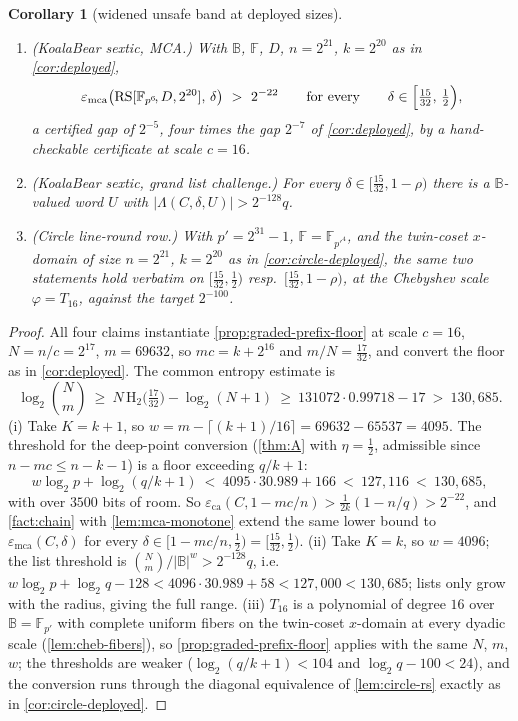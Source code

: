 \documentclass[11pt]{article}
\newtheorem{corollary}[corollary]{Corollary}
\theoremstyle{definition}
\theoremstyle{remark}
\newcommand{\F}{\mathbb{F}}
\newcommand{\B}{\mathbb{B}}
\newcommand{\RS}{\mathrm{RS}}
\newcommand{\eca}{\varepsilon_{\mathrm{ca}}}
\newcommand{\emca}{\varepsilon_{\mathrm{mca}}}
\newcommand{\Lst}{\Lambda}
\newcommand{\Hb}{\mathrm{H}_2}
\begin{document}
\begin{corollary}[widened unsafe band at deployed sizes]\label{cor:widened-deployed}
\begin{enumerate}[label=\textup{(\roman*)}]
\item \textup{(KoalaBear sextic, MCA.)} With $\B$, $\F$, $D$, $n=2^{21}$, $k=2^{20}$ as in \cref{cor:deployed},
\[
\emca\bigl(\RS[\F_{p^6}\!,D,2^{20}],\,\delta\bigr)\ >\ 2^{-22}
\qquad\text{for every}\qquad
\delta\in\Bigl[\tfrac{15}{32},\,\tfrac12\Bigr),
\]
a certified gap of $2^{-5}$, four times the gap $2^{-7}$ of \cref{cor:deployed}, by a hand-checkable certificate at scale $c=16$.
\item \textup{(KoalaBear sextic, grand list challenge.)} For every $\delta\in[\tfrac{15}{32},1-\rho)$ there is a $\B$-valued word $U$ with $|\Lst(C,\delta,U)|>2^{-128}q$.
\item \textup{(Circle line-round row.)} With $p'=2^{31}-1$, $\F=\F_{p'^4}$, and the twin-coset $x$-domain of size $n=2^{21}$, $k=2^{20}$ as in \cref{cor:circle-deployed}, the same two statements hold verbatim on $[\tfrac{15}{32},\tfrac12)$ resp.\ $[\tfrac{15}{32},1-\rho)$, at the Chebyshev scale $\varphi=T_{16}$, against the target $2^{-100}$.
\end{enumerate}
\end{corollary}

\begin{proof}
All four claims instantiate \cref{prop:graded-prefix-floor} at scale $c=16$, $N=n/c=2^{17}$, $m=69632$, so $mc=k+2^{16}$ and $m/N=\tfrac{17}{32}$, and convert the floor as in \cref{cor:deployed}. The common entropy estimate is
\[
\log_2\binom{N}{m}\ \ge\ N\,\Hb\bigl(\tfrac{17}{32}\bigr)-\log_2(N+1)\ \ge\ 131072\cdot0.99718-17\ >\ 130{,}685 .
\]
\textup{(i)} Take $K=k+1$, so $w=m-\lceil(k+1)/16\rceil=69632-65537=4095$. The threshold for the deep-point conversion (\cref{thm:A} with $\eta=\tfrac12$, admissible since $n-mc\le n-k-1$) is a floor exceeding $q/k+1$:
\[
w\log_2p+\log_2(q/k+1)\ <\ 4095\cdot30.989+166\ <\ 127{,}116\ <\ 130{,}685 ,
\]
with over $3500$ bits of room. So $\eca(C,1-mc/n)>\tfrac1{2k}(1-n/q)>2^{-22}$, and \cref{fact:chain} with \cref{lem:mca-monotone} extend the same lower bound to $\emca(C,\delta)$ for every $\delta\in[1-mc/n,\tfrac12)=[\tfrac{15}{32},\tfrac12)$.
\textup{(ii)} Take $K=k$, so $w=4096$; the list threshold is $\binom Nm/|\B|^w>2^{-128}q$, i.e.\ $w\log_2p+\log_2q-128<4096\cdot30.989+58<127{,}000<130{,}685$; lists only grow with the radius, giving the full range.
\textup{(iii)} $T_{16}$ is a polynomial of degree $16$ over $\B=\F_{p'}$ with complete uniform fibers on the twin-coset $x$-domain at every dyadic scale (\cref{lem:cheb-fibers}), so \cref{prop:graded-prefix-floor} applies with the same $N$, $m$, $w$; the thresholds are weaker ($\log_2(q/k+1)<104$ and $\log_2q-100<24$), and the conversion runs through the diagonal equivalence of \cref{lem:circle-rs} exactly as in \cref{cor:circle-deployed}.
\end{proof}
\end{document}
